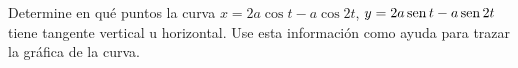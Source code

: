 \item Determine en qué puntos la curva $x = 2a\cos t - a\cos 2t$, $y = 2a\operatorname{sen} t - a\operatorname{sen} 2t$ tiene tangente vertical u horizontal. Use esta información como ayuda para trazar la gráfica de la curva.
